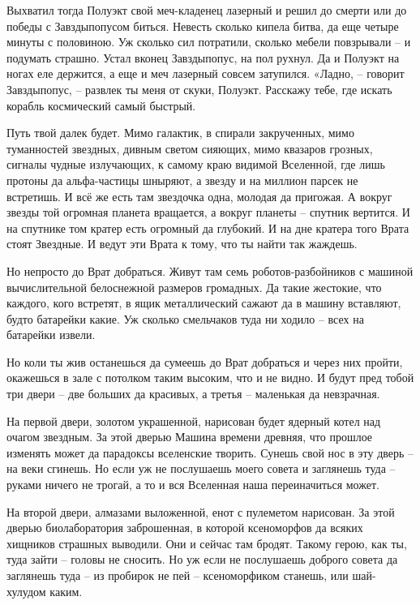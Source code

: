 \documentclass[ebook,oneside,final,openright]{memoir}
\begin{document}
\par
Выхватил тогда Полуэкт свой меч-кладенец лазерный и решил до смерти или до победы с Завздыпопусом биться. Невесть сколько кипела битва, да еще четыре минуты с половиною. Уж сколько сил потратили, сколько мебели повзрывали – и подумать страшно. Устал вконец Завздыпопус, на пол рухнул. Да и Полуэкт на ногах еле держится, а еще и меч лазерный совсем затупился. «Ладно, – говорит Завздыпопус, – развлек ты меня от скуки, Полуэкт. Расскажу тебе, где искать корабль космический самый быстрый.\par
\par
Путь твой далек будет. Мимо галактик, в спирали закрученных, мимо туманностей звездных, дивным светом сияющих, мимо квазаров грозных, сигналы чудные излучающих, к самому краю видимой Вселенной, где лишь протоны да альфа-частицы шныряют, а звезду и на миллион парсек не встретишь. И всё же есть там звездочка одна, молодая да пригожая. А вокруг звезды той огромная планета вращается, а вокруг планеты – спутник вертится. И на спутнике том кратер есть огромный да глубокий. И на дне кратера того Врата стоят Звездные. И ведут эти Врата к тому, что ты найти так жаждешь.\par
\par
Но непросто до Врат добраться. Живут там семь роботов-разбойников с машиной вычислительной белоснежной размеров громадных. Да такие жестокие, что каждого, кого встретят, в ящик металлический сажают да в машину вставляют, будто батарейки какие. Уж сколько смельчаков туда ни ходило – всех на батарейки извели.\par
\par
Но коли ты жив останешься да сумеешь до Врат добраться и через них пройти, окажешься в зале с потолком таким высоким, что и не видно. И будут пред тобой три двери – две больших да красивых, а третья – маленькая да невзрачная.\par
\par
На первой двери, золотом украшенной, нарисован будет ядерный котел над очагом звездным. За этой дверью Машина времени древняя, что прошлое изменять может да парадоксы вселенские творить. Сунешь свой нос в эту дверь – на веки сгинешь. Но если уж не послушаешь моего совета и заглянешь туда – руками ничего не трогай, а то и вся Вселенная наша переиначиться может.\par
\par
На второй двери, алмазами выложенной, енот с пулеметом нарисован. За этой дверью биолаборатория заброшенная, в которой ксеноморфов да всяких хищников страшных выводили. Они и сейчас там бродят. Такому герою, как ты, туда зайти – головы не сносить. Но уж если не послушаешь доброго совета да заглянешь туда – из пробирок не пей – ксеноморфиком станешь, или шай-хулудом каким.\par
\end{document}
